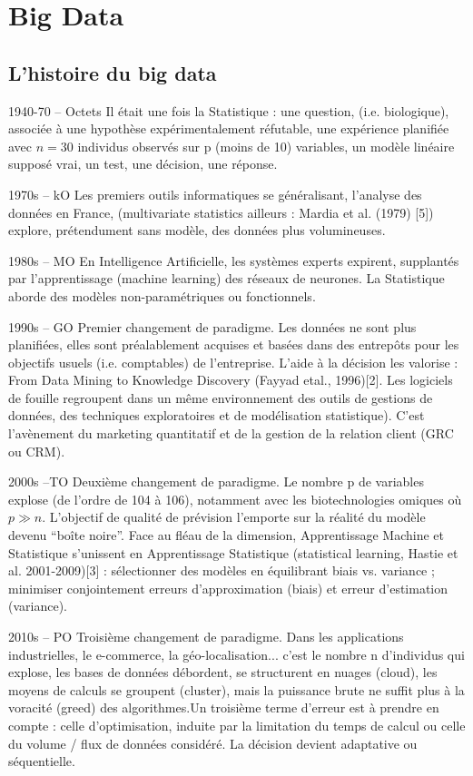 \documentclass[11pt,twoside,openany,x11names,svgnames]{memoir}
\begin{document}
\chapter{Big Data}
		\section{L'histoire du big data}
		\normalsize{ 1940-70 – Octets Il était une fois la Statistique : une question, (i.e. biologique),
associée à une hypothèse expérimentalement réfutable, une expérience planifiée avec $n=30$ individus observés sur p (moins de 10) variables, un modèle linéaire supposé vrai, un test, une décision, une réponse.

1970s – kO Les premiers outils informatiques se généralisant, l’analyse des données en France, (multivariate statistics ailleurs : Mardia et al. (1979) [5]) explore, prétendument sans modèle, des données plus volumineuses.

1980s – MO En Intelligence Artificielle, les systèmes experts expirent, supplantés par l’apprentissage (machine learning) des réseaux de neurones. La Statistique aborde des modèles non-paramétriques ou fonctionnels.

1990s – GO Premier changement de paradigme. Les données ne sont plus planifiées, elles sont préalablement acquises et basées dans des entrepôts pour les objectifs usuels (i.e. comptables) de l’entreprise. L’aide à la décision les valorise : From Data Mining to Knowledge Discovery (Fayyad etal., 1996)[2]. Les logiciels de fouille regroupent dans un même environnement des outils de gestions de données, des techniques exploratoires et de modélisation statistique). C’est l’avènement du marketing quantitatif et de la gestion de la relation client (GRC ou CRM).

2000s –TO Deuxième changement de paradigme. Le nombre p de variables explose (de l’ordre de 104 à 106), notamment avec les biotechnologies omiques où {$p\gg n$}. L’objectif de qualité de prévision l’emporte sur la
réalité du modèle devenu “boîte noire”. Face au fléau de la dimension, Apprentissage Machine et Statistique s’unissent en Apprentissage Statistique (statistical learning, Hastie et al. 2001-2009)[3] : sélectionner des modèles en équilibrant biais vs. variance ; minimiser conjointement erreurs d’approximation (biais) et erreur d’estimation (variance).

2010s – PO Troisième changement de paradigme. Dans les applications industrielles,
le e-commerce, la géo-localisation... c’est le nombre n d’individus qui explose, les bases de données débordent, se structurent en nuages (cloud), les moyens de calculs se groupent (cluster), mais la puissance brute ne suffit plus à la voracité (greed) des algorithmes.Un troisième terme d’erreur est à prendre en compte : celle d’optimisation, induite par la limitation du temps de calcul ou celle du volume / flux de données considéré. La décision devient adaptative ou séquentielle.}
		
\end{document}
